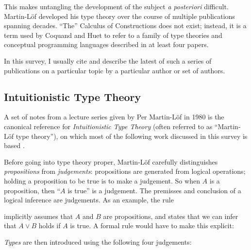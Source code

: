 \documentclass[12pt,toc=bibliography,numbers=noendperiod,
               footnotes=multiple,twoside]{scrartcl}
\begin{document}
This makes untangling the development of the subject \emph{a posteriori} difficult. Martin-Löf developed his type theory over the course of multiple publications spanning decades. \enquote{The} Calculus of Constructions does not exist; instead, it is a term used by Coquand and Huet to refer to a family of type theories and conceptual programming languages described in at least four papers.

In this survey, I usually cite and describe the latest of such a series of publications on a particular topic by a particular author or set of authors.

\subsection{Intuitionistic Type Theory}

A set of notes from a lecture series given by Per Martin-Löf in 1980 is the canonical reference for \emph{Intuitionistic Type Theory} (often referred to as \enquote{Martin-Löf type theory}), on which most of the following work discussed in this survey is based \autocite{sambin_intuitionistic_1984}.

Before going into type theory proper, Martin-Löf carefully distinguishes \emph{propositions} from \emph{judgements}: propositions are generated from logical operations; holding a proposition to be true is to make a judgement. So when \(A\) is a proposition, then \enquote{\(A\) is true} is a judgement. The premisses and conclusion of a logical inference are judgements. As an example, the rule

\begin{prooftree}
\end{prooftree}

implicitly assumes that \(A\) and \(B\) are propositions, and states that we can infer that \(A \vee B\) holds if \(A\) is true. A formal rule would have to make this explicit:

\begin{prooftree}
\end{prooftree}

\emph{Types} are then introduced using the following four judgements:
\end{document}
